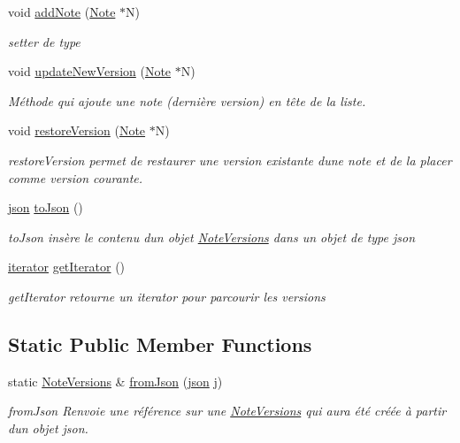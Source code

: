 \begin{DoxyCompactItemize}
void \hyperlink{classNoteVersions_aa3cea52090130714aae7ba4a6383c563}{add\+Note} (\hyperlink{classNote}{Note} $\ast$N)
\begin{DoxyCompactList}\small\item\em setter de type \end{DoxyCompactList}\item 
void \hyperlink{classNoteVersions_aae6abd5625c6741a7a1edc251372a469}{update\+New\+Version} (\hyperlink{classNote}{Note} $\ast$N)
\begin{DoxyCompactList}\small\item\em Méthode qui ajoute une note (dernière version) en tête de la liste. \end{DoxyCompactList}\item 
void \hyperlink{classNoteVersions_ab96dcb43270c73c6a918c6cc6a4aa924}{restore\+Version} (\hyperlink{classNote}{Note} $\ast$N)
\begin{DoxyCompactList}\small\item\em restore\+Version permet de restaurer une version existante d\textquotesingle{}une note et de la placer comme version courante. \end{DoxyCompactList}\item 
\hyperlink{classnlohmann_1_1basic__json}{json} \hyperlink{classNoteVersions_aee4095478320c9899cc0891af31f1151}{to\+Json} ()
\begin{DoxyCompactList}\small\item\em to\+Json insère le contenu d\textquotesingle{}un objet \hyperlink{classNoteVersions}{Note\+Versions} dans un objet de type json \end{DoxyCompactList}\item 
\hyperlink{classNoteVersions_1_1iterator}{iterator} \hyperlink{classNoteVersions_ad7531c8a160453b440f7d8194fe5c404}{get\+Iterator} ()
\begin{DoxyCompactList}\small\item\em get\+Iterator retourne un iterator pour parcourir les versions \end{DoxyCompactList}\end{DoxyCompactItemize}
\subsection*{Static Public Member Functions}
\begin{DoxyCompactItemize}
\item 
static \hyperlink{classNoteVersions}{Note\+Versions} \& \hyperlink{classNoteVersions_ac3bcced08e0e7b8afb62514e1f828abb}{from\+Json} (\hyperlink{classnlohmann_1_1basic__json}{json} j)
\begin{DoxyCompactList}\small\item\em from\+Json Renvoie une référence sur une \hyperlink{classNoteVersions}{Note\+Versions} qui aura été créée à partir d\textquotesingle{}un objet json. \end{DoxyCompactList}\end{DoxyCompactItemize}


